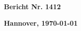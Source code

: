 \begin{minipage}[t]{0.5\textwidth}
    \begin{flushleft}
        \textbf{Bericht Nr. 1412}
    \end{flushleft}
\end{minipage}
%
\begin{minipage}[t]{0.5\textwidth}
    \begin{flushright}
        \textbf{Hannover, \today}
    \end{flushright}
\end{minipage}


